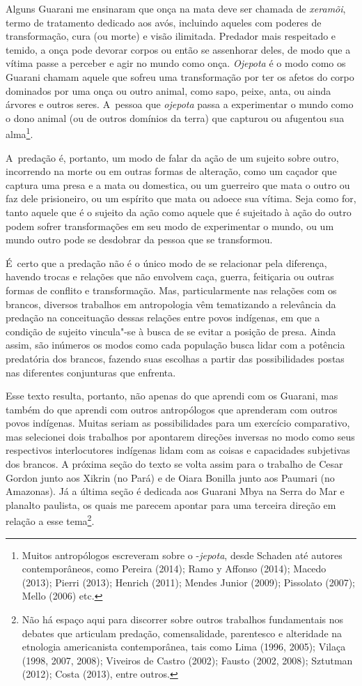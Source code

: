 Alguns Guarani me ensinaram que onça na mata deve ser chamada de
\emph{xeramõi}, termo de tratamento dedicado aos avós, incluindo aqueles com
poderes de transformação, cura (ou morte) e visão ilimitada. Predador
mais respeitado e temido, a onça pode devorar corpos ou então se
assenhorar deles, de modo que a vítima passe a perceber e agir no mundo
como onça. \emph{Ojepota} é o modo como os Guarani chamam aquele que sofreu
uma transformação por ter os afetos do corpo dominados por uma onça ou
outro animal, como sapo, peixe, anta, ou ainda árvores e outros seres.
A~pessoa que \emph{ojepota} passa a experimentar o mundo como o dono animal
(ou de outros domínios da terra) que capturou ou afugentou sua
alma\footnote{Muitos antropólogos escreveram sobre o -\emph{jepota}, desde
Schaden até autores contemporâneos, como Pereira (2014); Ramo y Affonso
(2014); Macedo (2013); Pierri (2013); Henrich (2011); Mendes Junior
(2009); Pissolato (2007); Mello (2006) etc.}.

A~predação é, portanto, um modo de falar da ação de um sujeito sobre
outro, incorrendo na morte ou em outras formas de alteração, como um
caçador que captura uma presa e a mata ou domestica, ou um guerreiro
que mata o outro ou faz dele prisioneiro, ou um espírito que mata ou
adoece sua vítima. Seja como for, tanto aquele que é o sujeito da ação
como aquele que é sujeitado à ação do outro podem sofrer transformações
em seu modo de experimentar o mundo, ou um mundo outro pode se
desdobrar da pessoa que se transformou.

É~certo que a predação não é o único modo de se relacionar pela
diferença, havendo trocas e relações que não envolvem caça, guerra,
feitiçaria ou outras formas de conflito e transformação. Mas,
particularmente nas relações com os brancos, diversos trabalhos em
antropologia vêm tematizando a relevância da predação na conceituação
dessas relações entre povos indígenas, em que a condição de sujeito
vincula"-se à busca de se evitar a posição de presa. Ainda assim, são
inúmeros os modos como cada população busca lidar com a potência
predatória dos brancos, fazendo suas escolhas a partir das
possibilidades postas nas diferentes conjunturas que enfrenta.

Esse texto resulta, portanto, não apenas do que aprendi com os Guarani,
mas também do que aprendi com outros antropólogos que aprenderam com
outros povos indígenas. Muitas seriam as possibilidades para um
exercício comparativo, mas selecionei dois trabalhos por apontarem
direções inversas no modo como seus respectivos interlocutores
indígenas lidam com as coisas e capacidades subjetivas dos brancos. A
próxima seção do texto se volta assim para o trabalho de Cesar Gordon
junto aos Xikrin (no Pará) e de Oiara Bonilla junto aos Paumari (no
Amazonas). Já a última seção é dedicada aos Guarani Mbya na Serra do
Mar e planalto paulista, os quais me parecem apontar para uma terceira
direção em relação a esse tema\footnote{Não há espaço aqui para
discorrer sobre outros trabalhos fundamentais nos debates que articulam
predação, comensalidade, parentesco e alteridade na etnologia
americanista contemporânea, tais como Lima (1996, 2005); Vilaça (1998,
2007, 2008); Viveiros de Castro (2002); Fausto (2002, 2008); Sztutman
(2012); Costa (2013), entre outros.}. 

